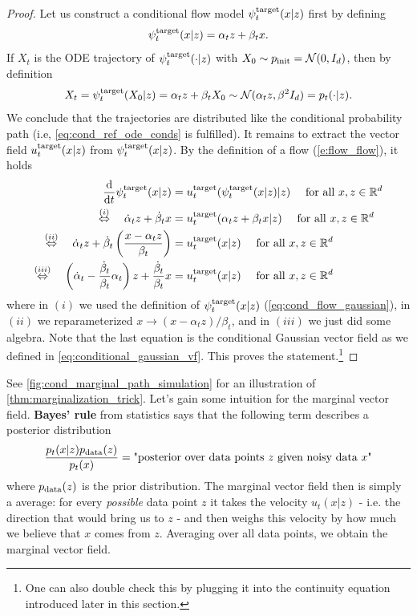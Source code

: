 \begin{examplebox}
\begin{proof}
Let us construct a conditional flow model $\psi^{\text{target}}_t(x|z)$ first by defining
\begin{align}
    \label{eq:cond_flow_gaussian}
    \psi^{\text{target}}_t(x|z) = \alpha_t z + \beta_t x.
\end{align}
If $X_t$ is the ODE trajectory of $\psi^{\text{target}}_t(\cdot|z)$ with $X_0\sim p_{\rm{init}} = \mathcal{N}(0,I_d)$, then by definition
\begin{align*}
    X_t = \psi^{\text{target}}_t(X_0|z) = \alpha_t z + \beta_t X_0 \sim \mathcal{N}(\alpha_t z,\beta^2 I_d) = p_t(\cdot|z).
\end{align*}
We conclude that the trajectories are distributed like the conditional probability path (i.e, \cref{eq:cond_ref_ode_conds} is fulfilled). It remains to extract the vector field $u^{\text{target}}_t(x|z)$ from $\psi^{\text{target}}_t(x|z)$. By the definition of a flow (\cref{e:flow_flow}), it holds
\begin{align*}
      \frac{\mathrm{d}}{\mathrm{d} t}\psi^{\text{target}}_{t}(x|z) &= u^{\text{target}}_t(\psi^{\text{target}}_t(x|z)|z)\quad \text{ for all }x,z\in\mathbb{R}^d\\
    \overset{(i)}{\Leftrightarrow} \quad \dot{\alpha}_tz+\dot{\beta}_tx &= u^{\text{target}}_t(\alpha_tz+\beta_t x|z)\quad \text{ for all }x,z\in\mathbb{R}^d\\
    \overset{(ii)}{\Leftrightarrow} \quad \dot{\alpha}_tz+\dot{\beta}_t\left(\frac{x-\alpha_tz}{\beta_t}\right)&= u^{\text{target}}_t(x|z)\quad \text{ for all }x,z\in\mathbb{R}^d\\
    \overset{(iii)}{\Leftrightarrow} \quad\left(\dot{\alpha}_t-\frac{\dot{\beta}_t}{\beta_t}\alpha_t\right)z+\frac{\dot{\beta}_t}{\beta_t}x &= u^{\text{target}}_t(x|z)\quad \text{ for all }x,z\in\mathbb{R}^d
\end{align*}
where in $(i)$ we used the definition of $\psi^{\text{target}}_t(x|z)$ (\cref{eq:cond_flow_gaussian}), in $(ii)$ we reparameterized $x\rightarrow (x-\alpha_t z)/\beta_t$, and in $(iii)$ we just did some algebra. Note that the last equation is the conditional Gaussian vector field as we defined in \cref{eq:conditional_gaussian_vf}. This proves the statement.\footnote{One can also double check this by plugging it into the continuity equation introduced later in this section.}
\end{proof}
\end{examplebox}

See \cref{fig:cond_marginal_path_simulation} for an illustration of  \cref{thm:marginalization_trick}. Let's gain some intuition for the marginal vector field. \textbf{Bayes' rule} from statistics says that the following term describes a posterior distribution
\begin{align*}
\frac{p_t(x|z)p_{\rm{data}}(z)}{p_t(x)} = \text{"posterior over data points }z\text{ given noisy data }x\text{"}
\end{align*}
where $p_{\rm{data}}(z)$ is the prior distribution. The marginal vector field then is simply a average: for every \emph{possible} data point $z$ it takes the velocity $u_t(x|z)$ - i.e. the direction that would bring us to $z$ - and then weighs this velocity by how much we believe that $x$ comes from $z$. Averaging over all data points, we obtain the marginal vector field. 

